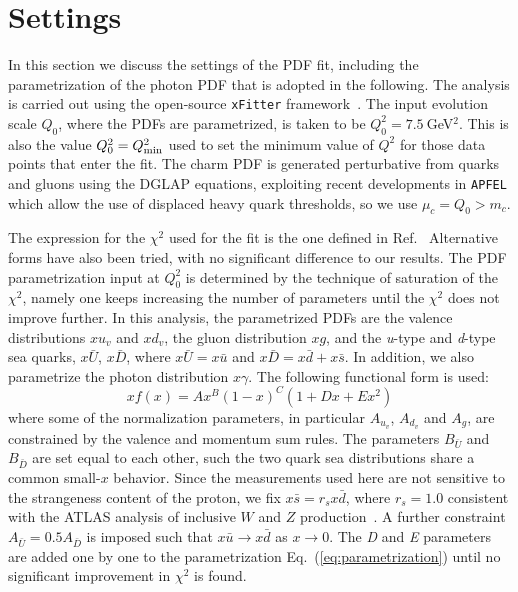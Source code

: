\section{Settings}
\label{sec:fitsettings}

In this section we discuss the settings of
the PDF fit, including the parametrization of the photon PDF
that is adopted in the following.
%
The analysis is carried out using the open-source
{\tt xFitter} framework~\cite{Alekhin:2014irh}.
%
The input evolution scale $Q_0$, where the PDFs
are parametrized, is taken to be $Q^2_0 = 7.5~$GeV$^2$.
%
This is also the value $Q^2_0=Q^2_{\rm min}$ used to set the
minimum value of $Q^2$ for those data points that enter the fit.
%
The charm PDF is generated perturbative from quarks and gluons
using the DGLAP equations, exploiting recent developments
in {\tt APFEL} which allow the use of displaced heavy quark
thresholds, so we use $\mu_c=Q_0 > m_c$.

The  expression for the $\chi^2$ used for the fit is the one
defined in Ref.~\cite{Aaron:2009aa}
%
Alternative forms have also been tried,
with no significant difference to our results.
% 
The PDF parametrization input at $Q^2_0$ is determined by the technique of saturation of the $\chi^{2}$, namely one keeps increasing
the number of parameters until the $\chi^{2}$ does not improve further.
%
In this analysis,
the parametrized PDFs are the valence distributions $xu_{v}$ and $xd_{v}$, the gluon distribution $xg$, and the \textit{u}-type and \textit{d}-type sea quarks, $x\bar{U}$, $x\bar{D}$, where $x\bar{U} = x\bar{u}$ and $x\bar{D} = x\bar{d} + x\bar{s}$.
%
In addition, we also parametrize the photon distribution $x\gamma$.
%
The following  functional form is used:
\begin{equation}
  \label{eq:parametrization}
xf(x) = Ax^{B}(1-x)^{C}(1+Dx+Ex^{2})
\end{equation}
where some of the normalization parameters, in particular
$A_{u_{v}}$, $A_{d_{v}}$ and $A_{g}$, are constrained by the valence and momentum
sum rules.
%
The  parameters $B_{\bar{U}}$ and $B_{\bar{D}}$ are set equal to each other, such
the two quark sea distributions share a common small-$x$ behavior.
%
Since the measurements used here are not sensitive to the 
strangeness content of the proton, we fix $x\bar{s} = r_sx\bar{d}$, where $r_s=1.0$ consistent with
the ATLAS 
analysis of inclusive $W$ and $Z$ production~\cite{Aad:2012sb,Aaboud:2016btc}. 
%
A further constraint $A_{\bar{U}} = 0.5 A_{\bar{D}}$ is imposed such that $x\bar{u} \to x\bar{d}$ as $x \to 0$.
The \textit{D} and \textit{E} parameters are added one by one
to the parametrization Eq.~(\ref{eq:parametrization}) until no significant 
improvement in $\chi^{2}$ is found. 

